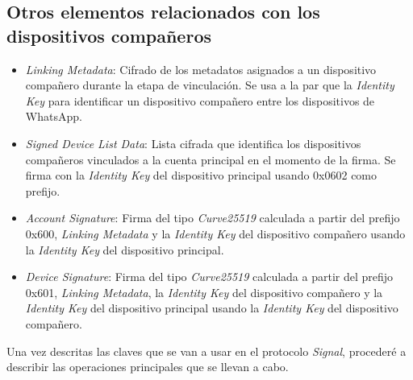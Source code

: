 \subsection{Otros elementos relacionados con los dispositivos compañeros}
\begin{itemize}
	\item \emph{Linking Metadata}: Cifrado de los metadatos asignados a un dispositivo compañero durante la etapa de vinculación. Se usa a la par que la \emph{Identity Key} para identificar un dispositivo compañero entre los dispositivos de WhatsApp.
	\item \emph{Signed Device List Data}: Lista cifrada que identifica los dispositivos compañeros vinculados a la cuenta principal en el momento de la firma. Se firma con la \emph{Identity Key} del dispositivo principal usando 0x0602 como prefijo.
	\item \emph{Account Signature}: Firma del tipo \emph{Curve25519} calculada a partir del prefijo 0x600, \emph{Linking Metadata} y la \emph{Identity Key} del dispositivo compañero usando la \emph{Identity Key} del dispositivo principal.
	\item \emph{Device Signature}: Firma del tipo \emph{Curve25519} calculada a partir del prefijo 0x601, \emph{Linking Metadata}, la \emph{Identity Key} del dispositivo compañero y la \emph{Identity Key} del dispositivo principal usando la \emph{Identity Key} del dispositivo compañero. 
\end{itemize}

Una vez descritas las claves que se van a usar en el protocolo \emph{Signal}, procederé a describir las operaciones principales que se llevan a cabo.

